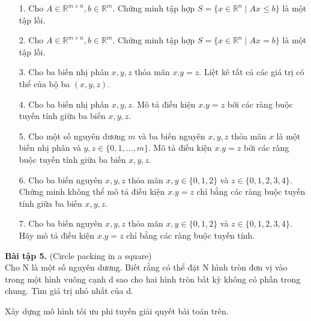 \documentclass[12pt]{article}
\newcommand{\R}{\mathbb{R}}
\begin{document}
    \begin{enumerate}
        \item[1.] Cho $A \in \R^{m \times n}, b \in \R^m$. Chứng minh tập hợp $S = \{x \in \R^n \mid Ax \leq b\}$ là một tập lồi.
        \item[2.] Cho $A \in \R^{m \times n}, b \in \R^m$. Chứng minh tập hợp $S = \{x \in \R^n \mid Ax = b\}$ là một tập lồi.
        \item[3.] Cho ba biến nhị phân $x, y, z$ thỏa mãn $x.y = z$. Liệt kê tất cả các giá trị có thể của bộ ba $(x, y, z)$.
        \item[4.] Cho ba biến nhị phân $x, y, z$. Mô tả điều kiện $x.y = z$ bởi các ràng buộc tuyến tính giữa ba biến $x, y, z$.
        \item[5.] Cho một số nguyên dương $m$ và ba biến nguyên $x, y, z$ thỏa mãn $x$ là một biến nhị phân và $y, z \in \{0, 1, \dots, m\}$. Mô tả điều kiện $x.y = z$ bởi các ràng buộc tuyến tính giữa ba biến $x, y, z$.
        \item[6.] Cho ba biến nguyên $x, y, z$ thỏa mãn $x, y \in \{0, 1, 2\}$ và $z \in \{0, 1, 2, 3, 4\}$. Chứng minh không thể mô tả điều kiện $x.y = z$ chỉ bằng các ràng buộc tuyến tính giữa ba biến $x, y, z$.
        \item[7.] Cho ba biến nguyên $x, y, z$ thỏa mãn $x, y \in \{0, 1, 2\}$ và $z \in \{0, 1, 2, 3, 4\}$. Hãy mô tả điều kiện $x.y = z$ chỉ bằng các ràng buộc tuyến tính.
    \end{enumerate}
    

    \textbf{Bài tập 5.} (Circle packing in a square)
    \\
    Cho N là một số nguyên dương. Biết rằng có thể đặt N hình tròn đơn vị vào trong một
    hình vuông cạnh d sao cho hai hình tròn bất kỳ không có phần trong chung. Tìm giá trị nhỏ nhất
    của d.

    Xây dựng mô hình tối ưu phi tuyến giải quyết bài toán trên.
    
\end{document}
